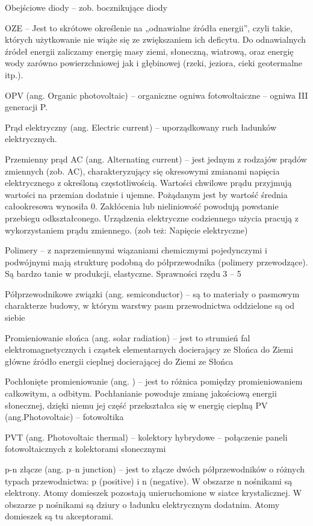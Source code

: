 \documentclass[12pt,a4paper]{article}
\begin{document}
Obejściowe diody – zob. bocznikujące diody

OZE –  Jest to skrótowe określenie na „odnawialne źródła energii”, czyli takie, których użytkowanie nie wiąże się ze zwiększaniem ich deficytu. Do odnawialnych źródeł energii zaliczamy energię masy ziemi, słoneczną, wiatrową, oraz energię wody zarówno powierzchniowej jak i głębinowej (rzeki, jeziora, cieki geotermalne itp.).

OPV (ang. Organic photovoltaic) – organiczne ogniwa fotowoltaiczne – ogniwa III generacji
P.

Prąd elektryczny (ang. Electric current) – uporządkowany ruch ładunków elektrycznych.

Przemienny prąd AC (ang. Alternating current) – jest jednym z rodzajów prądów zmiennych (zob. AC), charakteryzujący się okresowymi zmianami napięcia elektrycznego z określoną częstotliwością. Wartości chwilowe prądu przyjmują wartości na przemian dodatnie i ujemne. Pożądanym jest by wartość średnia całookresowa wynosiła 0. Zakłócenia lub nieliniowość powodują powstanie przebiegu odkształconego. Urządzenia elektryczne codziennego użycia pracują z wykorzystaniem prądu zmiennego. (zob też: Napięcie elektryczne)

Polimery – z naprzemiennymi wiązaniami chemicznymi pojedynczymi i podwójnymi mają strukturę podobną do półprzewodnika (polimery przewodzące). Są bardzo tanie w produkcji, elastyczne. Sprawności rzędu 3 – 5 %

Półprzewodnikowe związki (ang. semiconductor) – są to materiały o pasmowym charakterze budowy, w którym warstwy pasm przewodnictwa oddzielone są od siebie

Promieniowanie słońca (ang. solar radiation) – jest to strumień fal elektromagnetycznych i cząstek elementarnych docierający ze Słońca do Ziemi główne źródło energii cieplnej docierającej do Ziemi ze Słońca

Pochłonięte promieniowanie (ang. ) – jest to różnica pomiędzy promieniowaniem całkowitym, a odbitym. Pochłanianie powoduje zmianę jakościową energii słonecznej, dzięki niemu jej część przekształca się w energię cieplną
PV (ang.Photovoltaic) – fotowoltika

PVT (ang. Photovoltaic thermal) – kolektory hybrydowe – połączenie paneli fotowoltaicznych z kolektorami słonecznymi

p-n złącze (ang. p–n junction) – jest to złącze dwóch półprzewodników o różnych typach przewodnictwa: p (positive) i n (negative). W obszarze n nośnikami są elektrony. Atomy domieszek pozostają unieruchomione w siatce krystalicznej. W obszarze p nośnikami są dziury o ładunku elektrycznym dodatnim. Atomy domieszek są tu akceptorami.
\end{document}
